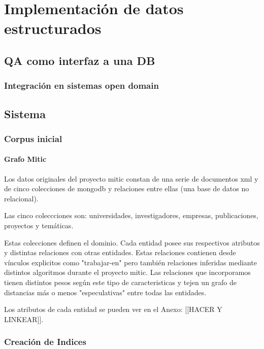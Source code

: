 \chapter{Implementación de datos estructurados}

\section{QA como interfaz a una DB}
\subsection{Integración en sistemas open domain}
\section{Sistema}

\subsection{Corpus inicial}

\subsubsection{Grafo Mitic}
Los datos originales del proyecto mitic constan de una serie de documentos 
xml y de cinco colecciones de mongodb y relaciones entre ellas (una base de datos no relacional).

Las cinco coleccciones son: universidades, investigadores, empresas,
publicaciones, proyectos y temáticas.

Estas colecciones definen el dominio. Cada entidad 
posee sus respectivos atributos y distintas relaciones con otras entidades.
Estas relaciones contienen desde vínculos explicitos como "trabajar-en"
pero también relaciones inferidas mediante distintos algoritmos durante el proyecto mitic.
Las relaciones que incorporamos tienen distintos pesos según este tipo de caracteristicas
y tejen un grafo de distancias más o menos "especulativas" entre todas las entidades.

Los atributos de cada entidad se pueden ver en el Anexo: [[HACER Y LINKEAR]].

\subsection{Creación de Indices}

